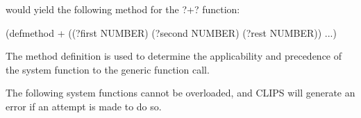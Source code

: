 \documentclass[letterpaper,10pt,english]{sphinxmanual}
\begin{document}
would yield the following method for the ?+? function:

\begin{sphinxVerbatim}[commandchars=\\\{\}]
(defmethod + ((?first NUMBER) (?second NUMBER) (\PYGZdl{}?rest NUMBER)) ...)
\end{sphinxVerbatim}

The method definition is used to determine the applicability and
precedence of the system function to the generic function call.

The following system functions cannot be overloaded, and CLIPS will
generate an error if an attempt is made to do so.


\begin{savenotes}\sphinxattablestart
\centering
\begin{tabulary}{\linewidth}[t]{|T|T|}
\hline


\end{tabulary}
\end{savenotes}
\end{document}

